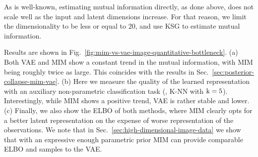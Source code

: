 
As is well-known, estimating mutual information directly, as done above, 
does not scale well as the input and latent dimensions increase.  
For that reason, we limit the dimensionality to be less or equal to 20, and use KSG to estimate mutual information.

Results are shown in Fig.\ \ref{fig:mim-vs-vae-image-quantitative-bottleneck}. (a) Both VAE and MIM show a constant trend in the mutual information, with MIM being roughly twice as large. This coincides with the results in Sec.\ \ref{sec:posterior-collapse-mim-vae}. (b) Here we measure the quality of the learned representation with an auxiliary non-parametric classification task (\ie, K-NN with ${\mathrm{k}} = 5$). Interestingly, while MIM shows a positive trend, VAE is rather stable and lower. (c) Finally, we also show the ELBO of both methods, where MIM clearly opts for a better latent representation on the expense of worse representation of the observations. We note that in Sec.\ \ref{sec:high-dimensional-image-data} we show that with an expressive enough parametric prior MIM can provide comparable ELBO and samples to the VAE.



 
